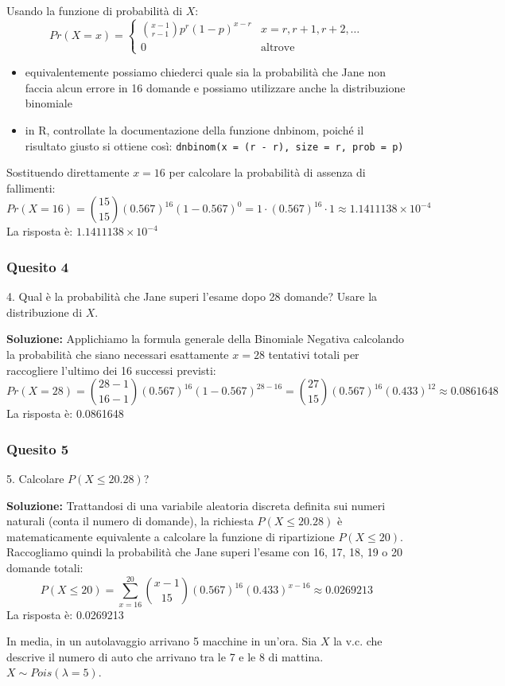 \documentclass[12pt, a4paper]{article}
\begin{document}
Usando la funzione di probabilità di $X$:
$$ Pr(X=x) = \begin{cases} \binom{x-1}{r-1} p^r (1-p)^{x-r} & x=r, r+1, r+2, \dots \\ 0 & \text{altrove} \end{cases} $$
\begin{itemize}
    \item equivalentemente possiamo chiederci quale sia la probabilità che Jane non faccia alcun errore in 16 domande e possiamo utilizzare anche la distribuzione binomiale
    \item in R, controllate la documentazione della funzione dnbinom, poiché il risultato giusto si ottiene così: \texttt{dnbinom(x = (r - r), size = r, prob = p)}
\end{itemize}
Sostituendo direttamente $x=16$ per calcolare la probabilità di assenza di fallimenti:
$$ Pr(X=16) = \binom{15}{15} (0.567)^{16} (1-0.567)^0 = 1 \cdot (0.567)^{16} \cdot 1 \approx 1.1411138 \times 10^{-4} $$
La risposta è: $1.1411138 \times 10^{-4}$

\subsubsection*{Quesito 4}
4. Qual è la probabilità che Jane superi l’esame dopo 28 domande? Usare la distribuzione di $X$.

\textbf{Soluzione:}
Applichiamo la formula generale della Binomiale Negativa calcolando la probabilità che siano necessari esattamente $x=28$ tentativi totali per raccogliere l'ultimo dei 16 successi previsti:
$$ Pr(X=28) = \binom{28-1}{16-1} (0.567)^{16} (1-0.567)^{28-16} = \binom{27}{15} (0.567)^{16} (0.433)^{12} \approx 0.0861648 $$
La risposta è: 0.0861648

\subsubsection*{Quesito 5}
5. Calcolare $P(X \leq 20.28)$?

\textbf{Soluzione:}
Trattandosi di una variabile aleatoria discreta definita sui numeri naturali (conta il numero di domande), la richiesta $P(X \leq 20.28)$ è matematicamente equivalente a calcolare la funzione di ripartizione $P(X \leq 20)$. Raccogliamo quindi la probabilità che Jane superi l'esame con 16, 17, 18, 19 o 20 domande totali:
$$ P(X \leq 20) = \sum_{x=16}^{20} \binom{x-1}{15} (0.567)^{16} (0.433)^{x-16} \approx 0.0269213 $$
La risposta è: 0.0269213


\vspace{0.5cm}
\begin{tcolorbox}[colback=lightergray!10, colframe=tocsec, title=\textbf{Esercizio 5}]
In media, in un autolavaggio arrivano 5 macchine in un’ora. Sia $X$ la v.c. che descrive il numero di auto che arrivano tra le 7 e le 8 di mattina. $X \sim Pois(\lambda=5)$.
\end{tcolorbox}
\end{document}
